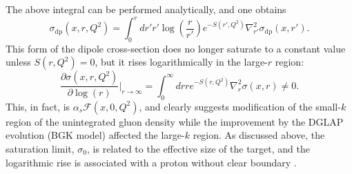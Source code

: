 \documentclass[11pt]{article}
\begin{document}
The above integral can be performed analytically, and one obtains
\begin{equation}
\sigma_{\mathrm{dp}}(x,r,Q^2) =\int^r _0 d {r'}   {r'}  \log\left(\frac{r}{{r'} }\right) e^{-S({r'} ,Q^2)} \nabla^2_{{r'} }\sigma_{\mathrm{dp}}(x,{r'} ).
\label{eq:gbssigma}
\end{equation}
This form of the dipole cross-section does no longer saturate to a constant value unless $S(r,Q^2)=0$, but it rises logarithmically in the large-$r$ region:
\begin{equation}
\frac{\partial \sigma(x,r,Q^2)}{\partial \log (r)}\Big|_{r\rightarrow\infty}=\int^\infty_0 dr re^{-S(r,Q^2)}\nabla_r^2\sigma(x,r)\neq0.%
\end{equation}   
This, in fact, is $\alpha_s\mathcal{F}(x,0,Q^2)$, and clearly suggests modification of the small-$k$ region of the unintegrated gluon density while the improvement by the DGLAP evolution (BGK model) affected the large-$k$ region.  
As discussed above, the saturation limit, $\sigma_0$, is related to the effective size of the target, and the logarithmic rise is associated with a proton without clear boundary \cite{gbw1998}.
\end{document}
